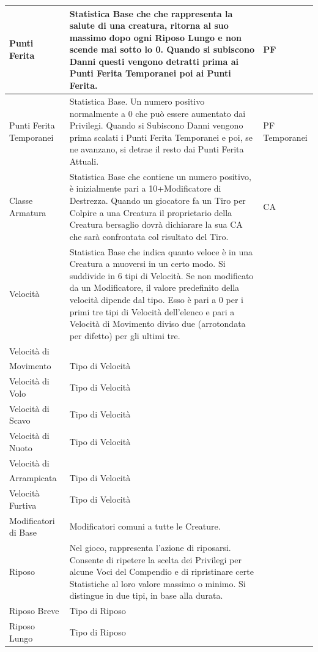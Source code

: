 \documentclass[a4paper, 11pt]{article}
\let\newline\\
\begin{document}
\begin{center}
\begin{longtable}{ |p{3.5cm}|p{9cm}|p{3cm}|  }
    Punti Ferita & Statistica Base che che rappresenta la salute di una creatura, ritorna al suo massimo dopo ogni Riposo Lungo e non scende mai sotto lo 0. Quando si subiscono Danni questi vengono detratti prima ai Punti Ferita Temporanei poi ai Punti Ferita. & PF \\\hline
    Punti Ferita Temporanei & Statistica Base. Un numero positivo normalmente a 0 che può essere aumentato dai Privilegi. Quando si Subiscono Danni vengono prima scalati i Punti Ferita Temporanei e poi, se ne avanzano, si detrae il resto dai Punti Ferita Attuali. & PF Temporanei \\\hline
    Classe Armatura & Statistica Base che contiene un numero positivo, è inizialmente pari a 10+Modificatore di Destrezza. Quando un giocatore fa un Tiro per Colpire a una Creatura il proprietario della Creatura bersaglio dovrà dichiarare la sua CA che sarà confrontata col risultato del Tiro. & CA \\\hline
    Velocità & Statistica Base che indica quanto veloce è in una Creatura a muoversi in un certo modo. Si suddivide in 6 tipi di Velocità. Se non modificato da un Modificatore, il valore predefinito della velocità dipende dal tipo. Esso è pari a 0 per i primi tre tipi di Velocità dell’elenco e pari a Velocità di Movimento diviso due (arrotondata per difetto) per gli ultimi tre. & \\\hline
    Velocità di \newline Movimento& Tipo di Velocità & \\\hline
    Velocità di Volo& Tipo di Velocità & \\\hline
    Velocità di Scavo& Tipo di Velocità & \\\hline
    Velocità di Nuoto& Tipo di Velocità & \\\hline
    Velocità di \newline Arrampicata& Tipo di Velocità & \\\hline
    Velocità Furtiva& Tipo di Velocità & \\\hline
    Modificatori di Base & Modificatori comuni a tutte le Creature. & \\\hline
    Riposo & Nel gioco, rappresenta l'azione di riposarsi. Consente di ripetere la scelta dei Privilegi per alcune Voci del Compendio e di ripristinare certe Statistiche al loro valore massimo o minimo. Si distingue in due tipi, in base alla durata. & \\\hline
    Riposo Breve & Tipo di Riposo & \\\hline
    Riposo Lungo & Tipo di Riposo & \\\hline
    \end{longtable}
\end{center}
\end{document}
